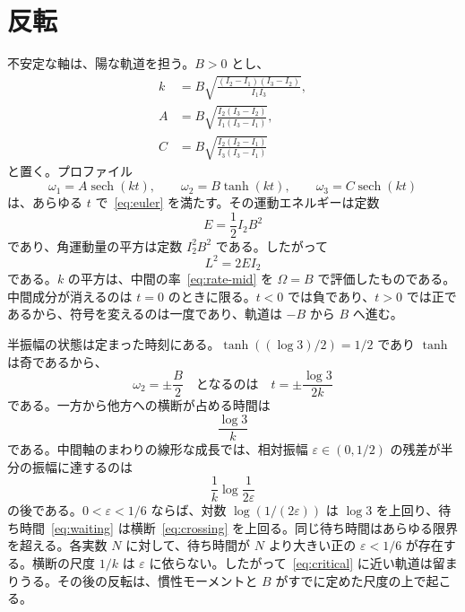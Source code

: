 \documentclass[a4paper]{article}
\begin{document}
\section{反転}
\label{sec:reversal}

不安定な軸は、陽な軌道を担う。\(B>0\) とし、
\begin{equation}
\label{eq:amplitudes}
\begin{aligned}
k&=B\sqrt{\frac{(I_2-I_1)(I_3-I_2)}{I_1 I_3}},\\[4pt]
A&=B\sqrt{\frac{I_2(I_3-I_2)}{I_1(I_3-I_1)}},\\[4pt]
C&=B\sqrt{\frac{I_2(I_2-I_1)}{I_3(I_3-I_1)}}
\end{aligned}
\end{equation}
と置く。プロファイル
\begin{equation}
\label{eq:separatrix}
\omega_1=A\operatorname{sech}(kt),\qquad
\omega_2=B\tanh(kt),\qquad
\omega_3=C\operatorname{sech}(kt)
\end{equation}
は、あらゆる \(t\) で~\eqref{eq:euler} を満たす。その運動エネルギーは定数
\begin{equation}
\label{eq:energy}
E=\frac12 I_2 B^2
\end{equation}
であり、角運動量の平方は定数 \(I_2^2 B^2\) である。したがって
\begin{equation}
\label{eq:critical}
L^2=2EI_2
\end{equation}
である。\(k\) の平方は、中間の率~\eqref{eq:rate-mid} を \(\Omega=B\) で評価したものである。中間成分が消えるのは \(t=0\) のときに限る。\(t<0\) では負であり、\(t>0\) では正であるから、符号を変えるのは一度であり、軌道は \(-B\) から \(B\) へ進む。

半振幅の状態は定まった時刻にある。\(\tanh((\log 3)/2)=1/2\) であり \(\tanh\) は奇であるから、
\[
\omega_2=\pm\frac B2
\quad\text{となるのは}\quad
t=\pm\frac{\log 3}{2k}
\]
である。一方から他方への横断が占める時間は
\begin{equation}
\label{eq:crossing}
\frac{\log 3}{k}
\end{equation}
である。中間軸のまわりの線形な成長では、相対振幅 \(\varepsilon\in(0,1/2)\) の残差が半分の振幅に達するのは
\begin{equation}
\label{eq:waiting}
\frac1k\log\frac{1}{2\varepsilon}
\end{equation}
の後である。\(0<\varepsilon<1/6\) ならば、対数 \(\log(1/(2\varepsilon))\) は \(\log 3\) を上回り、待ち時間~\eqref{eq:waiting} は横断~\eqref{eq:crossing} を上回る。同じ待ち時間はあらゆる限界を超える。各実数 \(N\) に対して、待ち時間が \(N\) より大きい正の \(\varepsilon<1/6\) が存在する。横断の尺度 \(1/k\) は \(\varepsilon\) に依らない。したがって~\eqref{eq:critical} に近い軌道は留まりうる。その後の反転は、慣性モーメントと \(B\) がすでに定めた尺度の上で起こる。
\end{document}
